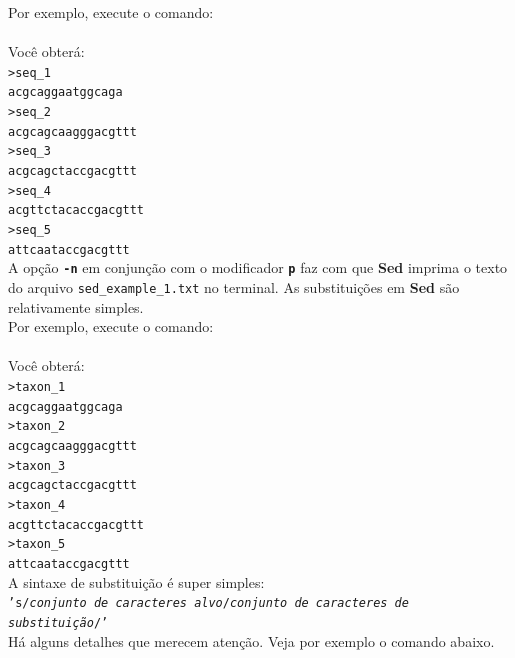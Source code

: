 \begin{refsection}
Por exemplo, execute o comando:\\
\\

Você obterá:\\
\texttt{>seq\_1}\\
\texttt{acgcaggaatggcaga}\\
\texttt{>seq\_2}\\
\texttt{acgcagcaagggacgttt}\\
\texttt{>seq\_3}\\
\texttt{acgcagctaccgacgttt}\\
\texttt{>seq\_4}\\
\texttt{acgttctacaccgacgttt}\\
\texttt{>seq\_5}\\
\texttt{attcaataccgacgttt}\\

A opção \texttt{\textbf{-n}} em conjunção com o modificador \texttt{\textbf{p}} faz com que \textbf{Sed} imprima o texto do arquivo \texttt{sed\_example\_1.txt} no terminal. As substituições em \textbf{Sed} são relativamente simples.\\

Por exemplo, execute o comando:\\
\\

Você obterá:\\
\texttt{>taxon\_1}\\
\texttt{acgcaggaatggcaga}\\
\texttt{>taxon\_2}\\
\texttt{acgcagcaagggacgttt}\\
\texttt{>taxon\_3}\\
\texttt{acgcagctaccgacgttt}\\
\texttt{>taxon\_4}\\
\texttt{acgttctacaccgacgttt}\\
\texttt{>taxon\_5}\\
\texttt{attcaataccgacgttt}\\

A sintaxe de substituição é super simples:\\
 \texttt{'s/\textit{conjunto de caracteres alvo}/\textit{conjunto de caracteres de substituição}/'}\\

Há alguns detalhes que merecem atenção. Veja por exemplo o comando abaixo.\\


\end{refsection}
